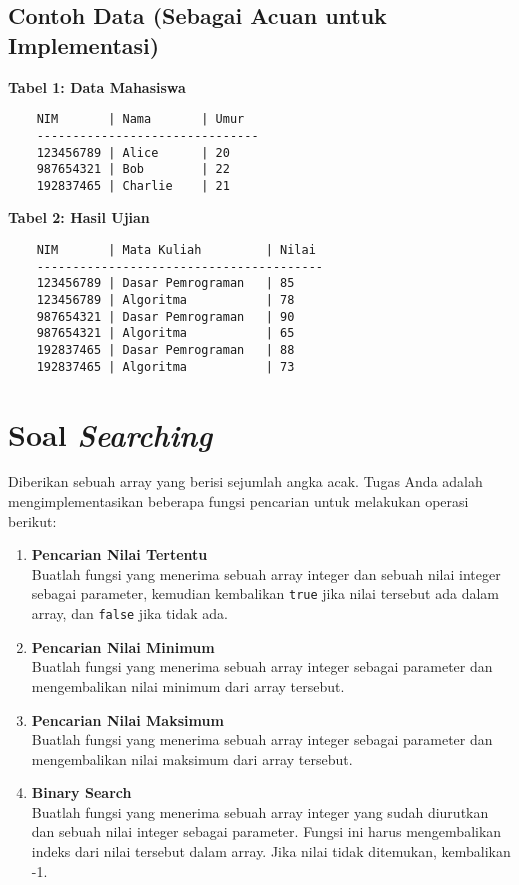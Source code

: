 \subsection{Contoh Data (Sebagai Acuan untuk Implementasi)}

\textbf{Tabel 1: Data Mahasiswa}
\begin{verbatim}
	NIM       | Nama       | Umur
	-------------------------------
	123456789 | Alice      | 20   
	987654321 | Bob        | 22   
	192837465 | Charlie    | 21   
\end{verbatim}

\textbf{Tabel 2: Hasil Ujian}
\begin{verbatim}
	NIM       | Mata Kuliah         | Nilai
	----------------------------------------
	123456789 | Dasar Pemrograman   | 85   
	123456789 | Algoritma           | 78   
	987654321 | Dasar Pemrograman   | 90   
	987654321 | Algoritma           | 65   
	192837465 | Dasar Pemrograman   | 88   
	192837465 | Algoritma           | 73   
\end{verbatim}

\section{Soal \textit{Searching}}

Diberikan sebuah array yang berisi sejumlah angka acak. Tugas Anda adalah mengimplementasikan beberapa fungsi pencarian untuk melakukan operasi berikut:

\begin{enumerate}
	\item \textbf{Pencarian Nilai Tertentu} \\
	Buatlah fungsi yang menerima sebuah array integer dan sebuah nilai integer sebagai parameter, kemudian kembalikan \texttt{true} jika nilai tersebut ada dalam array, dan \texttt{false} jika tidak ada.
	
	\item \textbf{Pencarian Nilai Minimum} \\
	Buatlah fungsi yang menerima sebuah array integer sebagai parameter dan mengembalikan nilai minimum dari array tersebut. 
	
	\item \textbf{Pencarian Nilai Maksimum} \\
	Buatlah fungsi yang menerima sebuah array integer sebagai parameter dan mengembalikan nilai maksimum dari array tersebut.
	
	\item \textbf{Binary Search} \\
	Buatlah fungsi yang menerima sebuah array integer yang sudah diurutkan dan sebuah nilai integer sebagai parameter. Fungsi ini harus mengembalikan indeks dari nilai tersebut dalam array. Jika nilai tidak ditemukan, kembalikan -1.
\end{enumerate}

